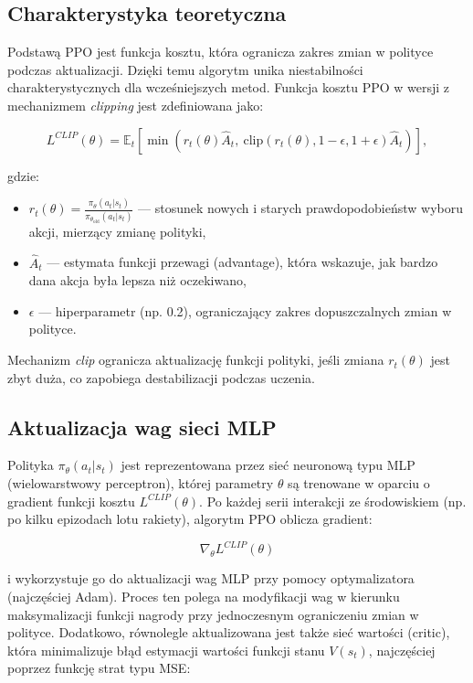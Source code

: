 \subsection{Charakterystyka teoretyczna}

Podstawą PPO jest funkcja kosztu, która ogranicza zakres zmian w polityce podczas aktualizacji. Dzięki temu algorytm unika niestabilności charakterystycznych dla wcześniejszych metod. Funkcja kosztu PPO w wersji z mechanizmem \textit{clipping} jest zdefiniowana jako:

\begin{equation}
L^{CLIP}(\theta) = \mathbb{E}_t\left[\min\left(r_t(\theta)\hat{A}_t, \ \text{clip}(r_t(\theta), 1-\epsilon, 1+\epsilon)\hat{A}_t\right)\right],
\end{equation}

gdzie:

\begin{itemize}
    \item $r_t(\theta) = \frac{\pi_\theta(a_t|s_t)}{\pi_{\theta_{\text{old}}}(a_t|s_t)}$ — stosunek nowych i starych prawdopodobieństw wyboru akcji, mierzący zmianę polityki,
    \item $\hat{A}_t$ — estymata funkcji przewagi (advantage), która wskazuje, jak bardzo dana akcja była lepsza niż oczekiwano,
    \item $\epsilon$ — hiperparametr (np. 0.2), ograniczający zakres dopuszczalnych zmian w polityce.
\end{itemize}

Mechanizm \textit{clip} ogranicza aktualizację funkcji polityki, jeśli zmiana $r_t(\theta)$ jest zbyt duża, co zapobiega destabilizacji podczas uczenia.

\subsection{Aktualizacja wag sieci MLP}

Polityka $\pi_\theta(a_t|s_t)$ jest reprezentowana przez sieć neuronową typu MLP (wielowarstwowy perceptron), której parametry $\theta$ są trenowane w oparciu o gradient funkcji kosztu $L^{CLIP}(\theta)$. Po każdej serii interakcji ze środowiskiem (np. po kilku epizodach lotu rakiety), algorytm PPO oblicza gradient:

\begin{equation}
\nabla_\theta L^{CLIP}(\theta)
\end{equation}

i wykorzystuje go do aktualizacji wag MLP przy pomocy optymalizatora (najczęściej Adam). Proces ten polega na modyfikacji wag w kierunku maksymalizacji funkcji nagrody przy jednoczesnym ograniczeniu zmian w polityce. Dodatkowo, równolegle aktualizowana jest także sieć wartości (critic), która minimalizuje błąd estymacji wartości funkcji stanu $V(s_t)$, najczęściej poprzez funkcję strat typu MSE:

